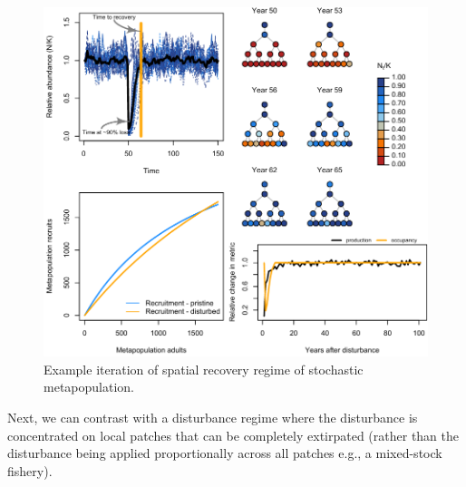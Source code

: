 \documentclass[
]{article}
\begin{document}
\begin{figure}[H]

{\centering \includegraphics{Managing_for_ecological_surprises_in_metapopulations_files/figure-latex/example results4-1} 

}

\caption{Example iteration of spatial recovery regime of stochastic metapopulation.}\label{fig:example results4}
\end{figure}

\newpage

Next, we can contrast with a disturbance regime where the disturbance is
concentrated on local patches that can be completely extirpated (rather
than the disturbance being applied proportionally across all patches
e.g., a mixed-stock fishery).
\end{document}
